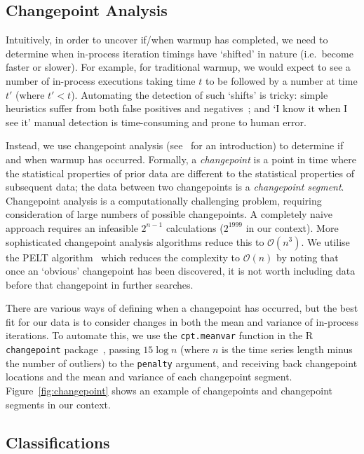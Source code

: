 \documentclass[acmsmall]{acmart}\settopmatter{printfolios=true}
\begin{document}
\subsection{Changepoint Analysis}

Intuitively, in order to uncover if/when warmup has completed, we need to
determine when in-process iteration timings have `shifted' in nature (i.e.~become
faster or slower). For example, for traditional warmup, we would expect to see a
number of in-process executions taking time $t$ to be followed by a number at
time $t'$ (where $t' < t$). Automating the detection of such `shifts' is
tricky: simple heuristics suffer from both false positives and negatives~\cite{kalibera13rigorous}; and
`I know it when I see it' manual detection is time-consuming and prone to human
error.

Instead, we use changepoint analysis (see~\citet{eckley11analysis} for an
introduction) to determine if and when warmup has occurred. Formally, a
\emph{changepoint} is a point in time where the statistical properties of prior
data are different to the statistical properties of subsequent data; the data
between two changepoints is a \emph{changepoint segment}.
Changepoint analysis is a computationally challenging problem, requiring
consideration of large numbers of possible changepoints. A completely naive
approach requires an infeasible $2^{n-1}$ calculations ($2^{1999}$ in our context).
More sophisticated changepoint analysis algorithms reduce this to $\mathcal{O}(n^3)$.
We utilise the PELT algorithm~\cite{killick12optimal} which reduces the
complexity to $\mathcal{O}(n)$ by noting that once an
`obvious' changepoint has been discovered, it is not worth including
data before that changepoint in further searches.

There are various ways of defining when a changepoint has occurred, but the best fit
for our data is to consider changes in both the mean and variance of in-process
iterations. To automate this, we use the \texttt{cpt.meanvar} function in the R
\texttt{changepoint} package~\cite{killick14changepoint}, passing $15\log{n}$ (where
$n$ is the time series length minus the number of outliers) to the
\texttt{penalty} argument, and receiving back changepoint locations and the mean and variance
of each changepoint segment. Figure~\ref{fig:changepoint} shows an example of changepoints and
changepoint segments in our context.


\subsection{Classifications}
\label{sec:classifications}
\end{document}
